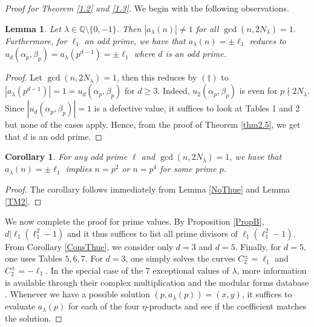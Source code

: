 \documentclass[12pt]{amsart}
\newtheorem{lem}{Lemma}[section]
\newtheorem{cor}[thm]{Corollary}
\newcommand{\Q}{\mathbb{Q}}
\numberwithin{equation}{section}
\begin{document}
\begin{proof}[Proof for Theorem \ref{1.2} and \ref{1.3}]
We begin with the following observations.

\begin{lem}{\label{mainlem}}
Let $\lambda\in \Q \setminus\{0,-1\}$. Then $|a_\lambda(n)|\neq 1$ for all $\gcd(n,2N_\lambda)=1$. Furthermore, for $\ell_1$ an odd prime, we have that $a_\lambda(n)=\pm\ell_1$ reduces to $u_d(\alpha_p,\beta_p)=a_\lambda(p^{d-1})=\pm\ell_1$ where $d$ is an odd prime. 
\end{lem}
\begin{proof}
Let $\gcd(n,2N_\lambda)=1$, then this reduces by $(\dagger)$ to $|a_\lambda(p^{d-1})|=1=u_{d}(\alpha_p,\beta_p)$ for $d\geq 3$. Indeed, $u_2(\alpha_p,\beta_p)$ is even for $p\nmid 2N_\lambda$. Since $|u_{d}(\alpha_p,\beta_p)|= 1$ is a defective value, it suffices to look at Tables 1 and 2 but none of the cases apply. Hence, from the proof of Theorem \ref{thm2.5}, we get that $d$ is an odd prime.  
\end{proof}

\begin{cor}{\label{ConsThue}}
For any odd prime $\ell$ and $\gcd(n,2N_\lambda)=1$, we have that $a_\lambda(n)=\pm\ell_1$ implies $n=p^2$ or $n=p^4$ for some prime $p$.
\end{cor}
\begin{proof}
The corollary follows immediately from Lemma \ref{NoThue} and Lemma \ref{TM2}. 
\end{proof}
We now complete the proof for prime values. By Proposition \ref{PropB}, $d|\ell_1(\ell_1^2-1)$ and it thus suffices to list all prime divisors of $\ell_1(\ell_1^2-1)$. From Corollary \ref{ConsThue}, we consider only $d=3$ and $d=5$. Finally, for $d=5$, one uses Tables $5,6,7$. For $d=3$, one simply solves the curves $C^\pm_2=\ell_1$ and $C^\pm_2=-\ell_1$. In the special case of the 7 exceptional values of $\lambda$, more information is available through their complex multiplication and the modular forms database \cite{LMFDB}. Whenever we have a possible solution $(p,a_\lambda(p))=(x,y)$, it suffices to evaluate $a_\lambda(p)$ for each of the four $\eta$-products and see if the coefficient matches the solution. 


\end{proof}
\end{document}
